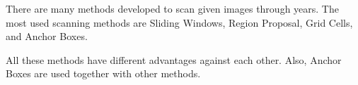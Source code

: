 \documentclass{article}
\begin{document}
\setlength{\parindent}{6ex}

There are many methods developed to scan given images through years.
The most used scanning methods are Sliding Windows, Region Proposal, 
Grid Cells, and Anchor Boxes.

\indent

All these methods have different advantages against each other. Also, 
Anchor Boxes are used together with other methods.
\end{document}
